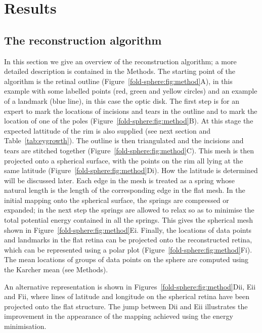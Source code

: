 \documentclass[10pt]{article}
\begin{document}
\section*{Results}

\subsection*{The reconstruction algorithm}

In this section we give an overview of the reconstruction algorithm; a
more detailed description is contained in the Methods. The starting
point of the algorithm is the retinal outline
(Figure~\ref{fold-sphere:fig:method}A), in this example with some
labelled points (red, green and yellow circles) and an example of a
landmark (blue line), in this case the optic disk.  The first step is
for an expert to mark the locations of incisions and tears in the
outline and to mark the location of one of the poles
(Figure~\ref{fold-sphere:fig:method}B). At this stage the expected
lattitude of the rim is also supplied (see next section and
Table~\ref{tab:eygrowth}). The outline is then triangulated and the
incisions and tears are stitched together
(Figure~\ref{fold-sphere:fig:method}C). This mesh is then projected
onto a spherical surface, with the points on the rim all lying at the
same latitude (Figure~\ref{fold-sphere:fig:method}Di). How the
latitude is determined will be discussed later. Each edge in the mesh
is treated as a spring whose natural length is the length of the
corresponding edge in the flat mesh.  In the initial mapping onto the
spherical surface, the springs are compressed or expanded; in the next
step the springs are allowed to relax so as to minimise the total
potential energy contained in all the springs. This gives the
spherical mesh shown in
Figure~\ref{fold-sphere:fig:method}Ei. Finally, the locations of data
points and landmarks in the flat retina can be projected onto the
reconstructed retina, which can be represented using a polar plot
(Figure~\ref{fold-sphere:fig:method}Fi). The mean locations of groups
of data points on the sphere are computed using the Karcher mean (see
Methods).

An alternative representation is shown in
Figures~\ref{fold-sphere:fig:method}Dii, Eii and Fii, where lines of
latitude and longitude on the spherical retina have been projected
onto the flat structure. The jump between Dii and Eii illustrates the
improvement in the appearance of the mapping achieved using the energy
minimisation.
\end{document}
